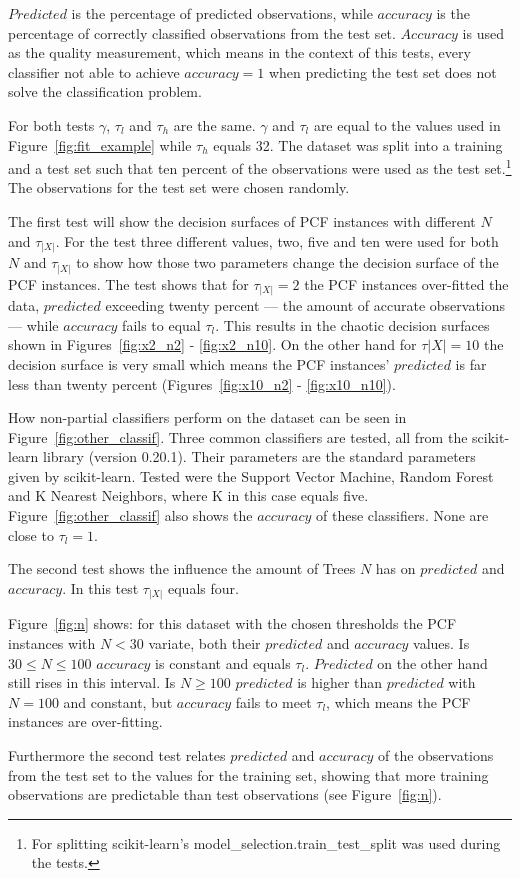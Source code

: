 $Predicted$ is the percentage of predicted observations,
while $accuracy$ is the percentage of correctly classified
observations from the test set. $Accuracy$ is used as the
quality measurement, which means in the context of this
tests, every classifier not able to achieve $accuracy = 1$
when predicting the test set does not solve the
classification problem.

For both tests $\gamma$, $\tau_l$ and $\tau_h$ are the
same. $\gamma$ and $\tau_l$ are equal to the values used in
Figure~\ref{fig:fit_example} while $\tau_h$ equals 32. The
dataset was split into a training and a test set such
that ten percent of the observations were used as the test
set.\footnote{For splitting scikit-learn's
  model\_selection.train\_test\_split was used during the
  tests.\cite{sklearn_api}} The observations for the test
set were chosen randomly.

The first test will show the decision surfaces of PCF
instances with different $N$ and $\tau_{|X|}$. For the test
three different values, two, five and ten were used for
both $N$ and $\tau_{|X|}$ to show how those two parameters
change the decision surface of the PCF instances. The test
shows that for $\tau_{|X|} = 2$ the PCF instances
over-fitted the data, $predicted$ exceeding twenty percent
--- the amount of accurate observations --- while
$accuracy$ fails to equal $\tau_l$. This results in the
chaotic decision surfaces shown in Figures~\ref{fig:x2_n2}
- \ref{fig:x2_n10}. On the other hand for $\tau{|X|} = 10$
the decision surface is very small which means the PCF
instances' $predicted$ is far less than twenty percent
(Figures~\ref{fig:x10_n2} - \ref{fig:x10_n10}).

How non-partial classifiers perform on the dataset can be
seen in Figure~\ref{fig:other_classif}. Three common
classifiers are tested, all from the scikit-learn library
(version 0.20.1).\cite{sklearn_api}
Their parameters are the standard parameters given by
scikit-learn. Tested were the Support Vector Machine,
Random Forest and K Nearest Neighbors, where K in this case
equals five.\cite{sklearn_api}
Figure~\ref{fig:other_classif} also shows the $accuracy$ of
these classifiers. None are close to $\tau_l = 1$.

The second test shows the influence the amount of Trees $N$
has on $predicted$ and $accuracy$. In this test
$\tau_{|X|}$ equals four.

Figure~\ref{fig:n} shows: for this dataset with the
chosen thresholds the PCF instances with $N < 30$ variate,
both their $predicted$ and $accuracy$ values. Is $30 \leq N
\leq 100$ $accuracy$ is constant and equals $\tau_l$.
$Predicted$ on the other hand still rises in this
interval. Is $N \geq 100$ $predicted$ is higher than
$predicted$ with $N = 100$ and constant, but $accuracy$
fails to meet $\tau_l$, which means the PCF instances are
over-fitting.

Furthermore the second test relates $predicted$ and
$accuracy$ of the observations from the test set to the
values for the training set, showing that more training
observations are predictable than test observations
(see Figure~\ref{fig:n}).




